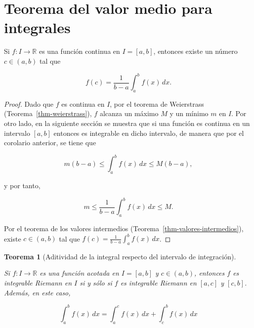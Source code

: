 \documentclass[
  a4paper,
]{scrreport}
\theoremstyle{definition}
\theoremstyle{definition}
\theoremstyle{definition}
\theoremstyle{plain}
\newtheorem{theorem}{Teorema}[chapter]
\theoremstyle{plain}
\theoremstyle{plain}
\theoremstyle{remark}
\begin{document}
\section{Teorema del valor medio para
integrales}\label{teorema-del-valor-medio-para-integrales}

Si \(f:I\to\mathbb{R}\) es una función continua en \(I=[a,b]\), entonces
existe un número \(c\in(a,b)\) tal que

\[
f(c) = \frac{1}{b-a}\int_a^b f(x)\,dx.
\]

\begin{tcolorbox}[enhanced jigsaw, bottomtitle=1mm, title=\textcolor{quarto-callout-note-color}{\faInfo}\hspace{0.5em}{Demostración}, colbacktitle=quarto-callout-note-color!10!white, coltitle=black, leftrule=.75mm, colback=white, toptitle=1mm, toprule=.15mm, titlerule=0mm, opacitybacktitle=0.6, colframe=quarto-callout-note-color-frame, bottomrule=.15mm, arc=.35mm, rightrule=.15mm, breakable, left=2mm, opacityback=0]

\begin{proof}
Dado que \(f\) es continua en \(I\), por el teorema de Weierstrass
(Teorema~\ref{thm-weierstrass}), \(f\) alcanza un máximo \(M\) y un
mínimo \(m\) en \(I\). Por otro lado, en la siguiente sección se muestra
que si una función es continua en un intervalo \([a,b]\) entonces es
integrable en dicho intervalo, de manera que por el corolario anterior,
se tiene que

\[
m(b-a)\leq \int_a^b f(x)\,dx \leq M(b-a), 
\]

y por tanto,

\[
m\leq \frac{1}{b-a}\int_a^b f(x)\,dx \leq M.
\]

Por el teorema de los valores intermedios
(Teorema~\ref{thm-valores-intermedios}), existe \(c\in(a,b)\) tal que
\(f(c)=\frac{1}{b-a}\int_a^b f(x)\,dx\).
\end{proof}

\end{tcolorbox}

\begin{theorem}[Aditividad de la integral respecto del intervalo de
integración]\protect\hypertarget{thm-aditividad-integral-intervalo}{}\label{thm-aditividad-integral-intervalo}

Si \(f:I\to\mathbb{R}\) es una función acotada en \(I=[a,b]\) y
\(c\in(a,b)\), entonces \(f\) es integrable Riemann en \(I\) si y sólo
si \(f\) es integrable Riemann en \([a,c]\) y \([c,b]\). Además, en este
caso,

\[
\int_a^b f(x)\,dx = \int_a^c f(x)\,dx + \int_c^b f(x)\,dx
\]

\end{theorem}
\end{document}
